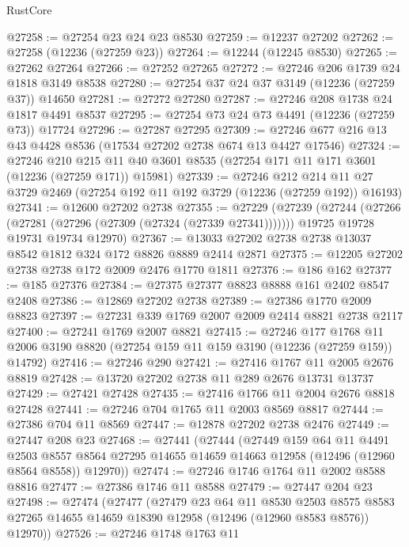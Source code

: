 \begin{lexlean}{RustCore}
\begin{coremodule}
@27258 := @27254 @23 @24 @23 @8530
@27259 := @12237 @27202
@27262 := @27258 (@12236 (@27259 @23))
@27264 := @12244 (@12245 @8530)
@27265 := @27262 @27264
@27266 := @27252 @27265
@27272 := @27246 @206 @1739 @24 @1818 @3149 @8538
@27280 := @27254 @37 @24 @37 @3149 (@12236 (@27259 @37)) @14650
@27281 := @27272 @27280
@27287 := @27246 @208 @1738 @24 @1817 @4491 @8537
@27295 := @27254 @73 @24 @73 @4491 (@12236 (@27259 @73)) @17724
@27296 := @27287 @27295
@27309 := @27246 @677 @216 @13 @43 @4428 @8536 (@17534 @27202 @2738 @674 @13 @4427 @17546)
@27324 := @27246
    @210
    @215
    @11
    @40
    @3601
    @8535
    (@27254 @171 @11 @171 @3601 (@12236 (@27259 @171)) @15981)
@27339 := @27246
    @212
    @214
    @11
    @27
    @3729
    @2469
    (@27254 @192 @11 @192 @3729 (@12236 (@27259 @192)) @16193)
@27341 := @12600 @27202 @2738
@27355 := @27229
    (@27239
      (@27244 (@27266 (@27281 (@27296 (@27309 (@27324 (@27339 @27341)))))))
      @19725
      @19728
      @19731
      @19734
      @12970)
@27367 := @13033 @27202 @2738 @2738 @13037 @8542 @1812 @324 @172 @8826 @8889 @2414 @2871
@27375 := @12205 @27202 @2738 @2738 @172 @2009 @2476 @1770 @1811
@27376 := @186 @162
@27377 := @185 @27376
@27384 := @27375 @27377 @8823 @8888 @161 @2402 @8547 @2408
@27386 := @12869 @27202 @2738
@27389 := @27386 @1770 @2009 @8823
@27397 := @27231 @339 @1769 @2007 @2009 @2414 @8821 @2738 @2117
@27400 := @27241 @1769 @2007 @8821
@27415 := @27246
    @177
    @1768
    @11
    @2006
    @3190
    @8820
    (@27254 @159 @11 @159 @3190 (@12236 (@27259 @159)) @14792)
@27416 := @27246 @290
@27421 := @27416 @1767 @11 @2005 @2676 @8819
@27428 := @13720 @27202 @2738 @11 @289 @2676 @13731 @13737
@27429 := @27421 @27428
@27435 := @27416 @1766 @11 @2004 @2676 @8818 @27428
@27441 := @27246 @704 @1765 @11 @2003 @8569 @8817
@27444 := @27386 @704 @11 @8569
@27447 := @12878 @27202 @2738 @2476
@27449 := @27447 @208 @23
@27468 := @27441
    (@27444
      (@27449
        @159
        @64
        @11
        @4491
        @2503
        @8557
        @8564
        @27295
        @14655
        @14659
        @14663
        @12958
        (@12496 (@12960 @8564 @8558))
        @12970))
@27474 := @27246 @1746 @1764 @11 @2002 @8588 @8816
@27477 := @27386 @1746 @11 @8588
@27479 := @27447 @204 @23
@27498 := @27474
    (@27477
      (@27479
        @23
        @64
        @11
        @8530
        @2503
        @8575
        @8583
        @27265
        @14655
        @14659
        @18390
        @12958
        (@12496 (@12960 @8583 @8576))
        @12970))
@27526 := @27246
    @1748
    @1763
    @11

\end{coremodule}
\end{lexlean}

